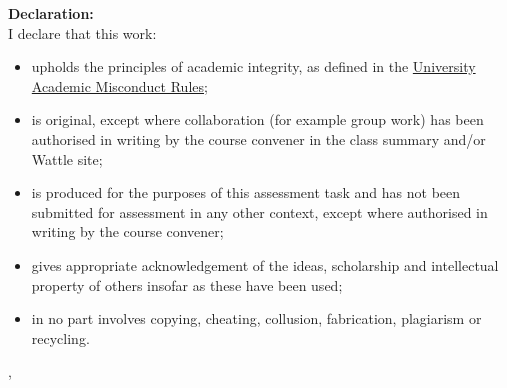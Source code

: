 {\sffamily\bfseries\Large Declaration:}\\

I declare that this work:\\

\begin{itemize}
  \item upholds the principles of academic integrity, as defined in the \href{https://www.anu.edu.au/about/governance/legislation}{University Academic Misconduct Rules};
  \item is original, except where collaboration (for example group work) has been authorised in writing by the course convener in the class summary and/or Wattle site;
  \item is produced for the purposes of this assessment task and has not been submitted for assessment in any other context, except where authorised in writing by the course convener;
  \item gives appropriate acknowledgement of the ideas, scholarship and intellectual property of others insofar as these have been used;
  \item in no part involves copying, cheating, collusion, fabrication, plagiarism or recycling.
\end{itemize}


\vspace{1 cm}
\hfill \monthname, \AuthorName
\newpage


